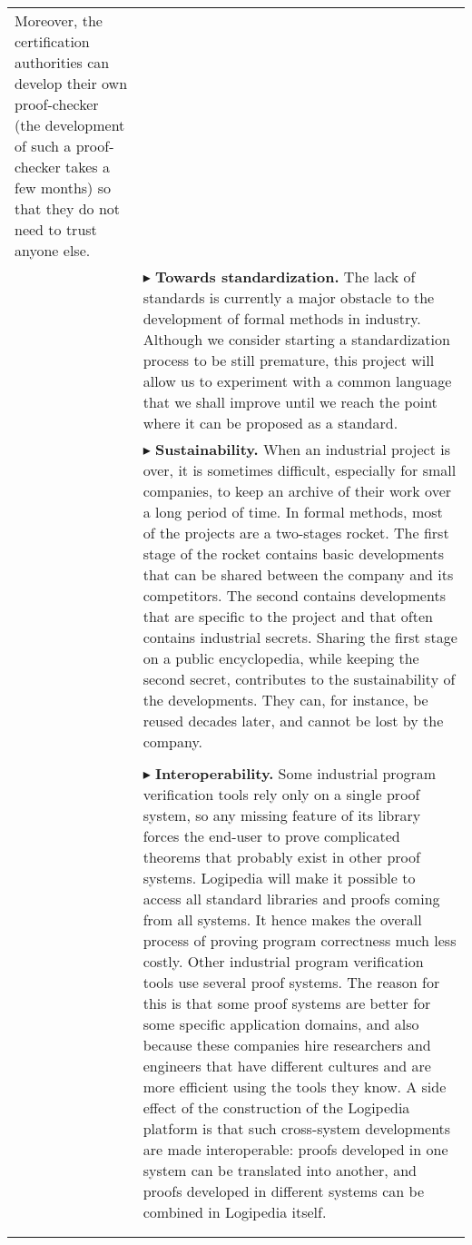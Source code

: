 \begin{longtable}{|p{}|p{}|}
Moreover, the certification authorities can develop their own
proof-checker (the development of such a proof-checker takes a few
months) so that they do not need to trust anyone else.\\
&
$\blacktriangleright$
{\bf Towards standardization.}
The lack of standards is currently a major obstacle to the development
of formal methods in industry. Although we consider starting a
standardization process to be still premature, this project will allow us
to experiment with a common language that we shall improve until we
reach the point where it can be proposed as a standard.\\
&
$\blacktriangleright$
{\bf Sustainability.}
When an industrial project is over, it is sometimes difficult,
especially for small companies, to keep an archive of their work over
a long period of time. In formal methods, most of the projects are a
two-stages rocket. The first stage of the rocket contains basic
developments that can be shared between the company and its
competitors. The second contains developments that are specific to the
project and that often contains industrial secrets.
Sharing the first stage on a public encyclopedia, while keeping the
second secret, contributes to the sustainability of the
developments. They can, for instance, be reused decades later, and
cannot be lost by the company.\\
&\\
&
$\blacktriangleright$
{\bf Interoperability.}
  Some industrial program verification tools rely only on a single
  proof system, so any missing feature of its library forces the
  end-user to prove complicated theorems that probably exist in other
  proof systems. Logipedia will make it possible to access all
  standard libraries and proofs coming from all systems. It hence
  makes the overall process of proving program correctness much less costly.
  Other industrial program verification tools use several proof
  systems. The reason for this is that some proof systems are better for some
  specific application domains, and also
  because these companies hire researchers and engineers that have
  different cultures and are more efficient using the tools they know.
  A side effect of the construction of the Logipedia platform is that
  such cross-system developments are made interoperable: proofs
  developed in one system can be translated into another, and
  proofs developed in different systems can be combined in
  Logipedia itself.\\
&\\
&
\hspace{0.4cm}

\end{longtable}

